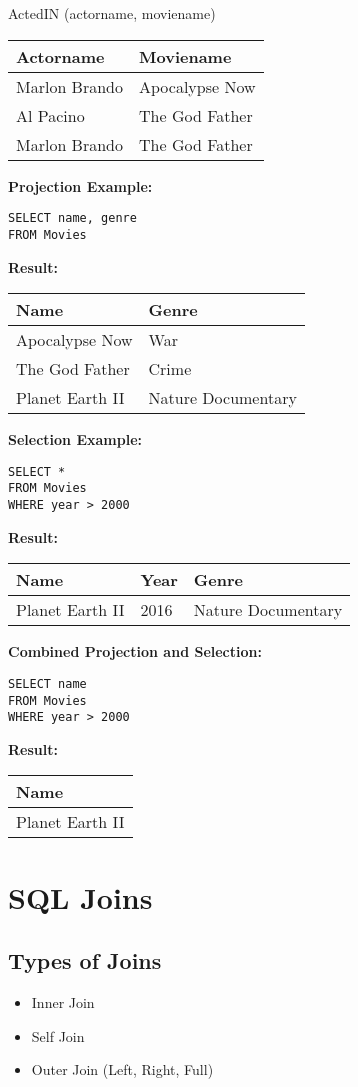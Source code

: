 \documentclass{article}
\begin{document}
ActedIN (actorname, moviename)
\begin{tabular}{ll}
\hline
Actorname & Moviename \\
\hline
Marlon Brando & Apocalypse Now \\
Al Pacino & The God Father \\
Marlon Brando & The God Father \\
\hline
\end{tabular}

\textbf{Projection Example:}
\begin{verbatim}
SELECT name, genre
FROM Movies
\end{verbatim}

\textbf{Result:}
\begin{tabular}{ll}
\hline
Name & Genre \\
\hline
Apocalypse Now & War \\
The God Father & Crime \\
Planet Earth II & Nature Documentary \\
\hline
\end{tabular}

\textbf{Selection Example:}
\begin{verbatim}
SELECT *
FROM Movies
WHERE year > 2000
\end{verbatim}

\textbf{Result:}
\begin{tabular}{lll}
\hline
Name & Year & Genre \\
\hline
Planet Earth II & 2016 & Nature Documentary \\
\hline
\end{tabular}

\textbf{Combined Projection and Selection:}
\begin{verbatim}
SELECT name
FROM Movies
WHERE year > 2000
\end{verbatim}

\textbf{Result:}
\begin{tabular}{l}
\hline
Name \\
\hline
Planet Earth II \\
\hline
\end{tabular}

\section*{SQL Joins}

\subsection*{Types of Joins}
\begin{itemize}
    \item Inner Join
    \item Self Join
    \item Outer Join (Left, Right, Full)
\end{itemize}
\end{document}
